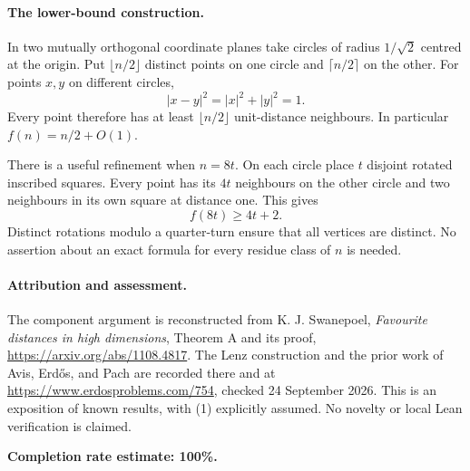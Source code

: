 \paragraph{The lower-bound construction.}
In two mutually orthogonal coordinate planes take circles of radius \(1/\sqrt2\) centred at the origin. Put \(\lfloor n/2\rfloor\) distinct points on one circle and \(\lceil n/2\rceil\) on the other. For points \(x,y\) on different circles,
\[
 |x-y|^2=|x|^2+|y|^2=1.
\]
Every point therefore has at least \(\lfloor n/2\rfloor\) unit-distance neighbours. In particular \(f(n)=n/2+O(1)\).

There is a useful refinement when \(n=8t\). On each circle place \(t\) disjoint rotated inscribed squares. Every point has its \(4t\) neighbours on the other circle and two neighbours in its own square at distance one. This gives
\[
 f(8t)\geq4t+2.
\]
Distinct rotations modulo a quarter-turn ensure that all vertices are distinct. No assertion about an exact formula for every residue class of \(n\) is needed.

\paragraph{Attribution and assessment.}
The component argument is reconstructed from K. J. Swanepoel, \emph{Favourite distances in high dimensions}, Theorem A and its proof, \url{https://arxiv.org/abs/1108.4817}. The Lenz construction and the prior work of Avis, Erd\H{o}s, and Pach are recorded there and at \url{https://www.erdosproblems.com/754}, checked 24 September 2026. This is an exposition of known results, with (1) explicitly assumed. No novelty or local Lean verification is claimed.

\textbf{Completion rate estimate: 100\%.}
